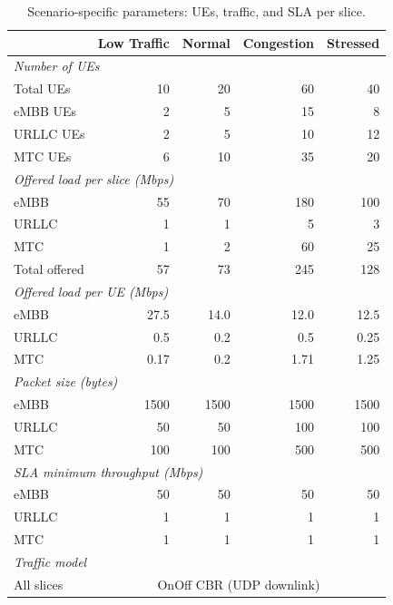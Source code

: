 \begin{table}[H]
\centering
\caption{Scenario-specific parameters: UEs, traffic, and SLA per slice.}
\label{tab:scenarios}
\begin{tabular}{lrrrr}
\toprule
 & \textbf{Low Traffic} & \textbf{Normal} & \textbf{Congestion} & \textbf{Stressed} \\
\midrule
\multicolumn{5}{l}{\textit{Number of UEs}} \\
Total UEs        & 10  & 20  & 60  & 40 \\
eMBB UEs         & 2   & 5   & 15  & 8 \\
URLLC UEs        & 2   & 5   & 10  & 12 \\
MTC UEs          & 6   & 10  & 35  & 20 \\
\midrule
\multicolumn{5}{l}{\textit{Offered load per slice (Mbps)}} \\
eMBB             & 55  & 70  & 180 & 100 \\
URLLC            & 1   & 1   & 5   & 3 \\
MTC              & 1   & 2   & 60  & 25 \\
Total offered    & 57  & 73  & 245 & 128 \\
\midrule
\multicolumn{5}{l}{\textit{Offered load per UE (Mbps)}} \\
eMBB             & 27.5 & 14.0 & 12.0 & 12.5 \\
URLLC            & 0.5  & 0.2  & 0.5  & 0.25 \\
MTC              & 0.17 & 0.2  & 1.71 & 1.25 \\
\midrule
\multicolumn{5}{l}{\textit{Packet size (bytes)}} \\
eMBB             & 1500 & 1500 & 1500 & 1500 \\
URLLC            & 50   & 50   & 100  & 100 \\
MTC              & 100  & 100  & 500  & 500 \\
\midrule
\multicolumn{5}{l}{\textit{SLA minimum throughput (Mbps)}} \\
eMBB             & 50   & 50   & 50   & 50 \\
URLLC            & 1    & 1    & 1    & 1 \\
MTC              & 1    & 1    & 1    & 1 \\
\midrule
\multicolumn{5}{l}{\textit{Traffic model}} \\
All slices       & \multicolumn{4}{c}{OnOff CBR (UDP downlink)} \\
\bottomrule
\end{tabular}
\end{table}


